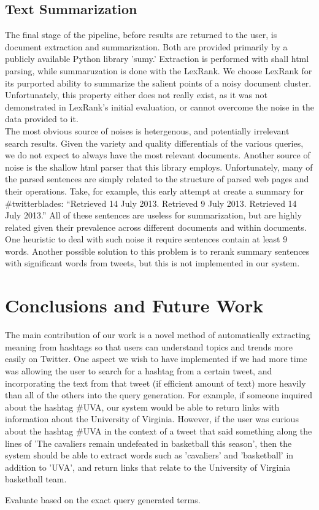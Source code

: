 \documentclass{sig-alternate}
\begin{document}
\subsection{Text Summarization}
The final stage of the pipeline, before results are returned to the user, is document extraction and summarization.  Both are provided primarily by a publicly available Python library 'sumy.'  Extraction is performed with shall html parsing, while summaruzation is done with the LexRank.\cite{lexrank}  We choose LexRank for its purported ability to summarize the salient points of a noisy document cluster.  Unfortunately, this property either does not really exist, as it was not demonstrated in LexRank's initial evaluation, or cannot overcome the noise in the data provided to it.\\
The most obvious source of noises is hetergenous, and potentially irrelevant search results.  Given the variety and quality differentials of the various queries, we do not expect to always have the most relevant documents. Another source of noise is the shallow html parser that this library employs.  Unfortunately, many of the parsed sentences are simply related to the structure of parsed web pages and their operations.  Take, for example, this early attempt at create a summary for \#twitterblades: ``Retrieved 14 July 2013. Retrieved 9 July 2013. Retrieved 14 July 2013.''  All of these sentences are useless for summarization, but are highly related given their prevalence across different documents and within documents.  One heuristic to deal with such noise it require sentences contain at least 9 words.  Another possible solution to this problem is to rerank summary sentences with significant words from tweets, but this is not implemented in our system.




\section{Conclusions and Future Work}
The main contribution of our work is a novel method of automatically extracting meaning from hashtags so that users can understand topics and trends more easily on Twitter. 
One aspect we wish to have implemented if we had more time was allowing the user to search for a hashtag from a certain tweet, and incorporating the text from that tweet (if efficient amount of text) more heavily than all of the others into the query generation. For example, if someone inquired about the hashtag \#UVA, our system would be able to return links with information about the University of Virginia. However, if the user was curious about the hashtag \#UVA in the context of a tweet that said something along the lines of 'The cavaliers remain undefeated in basketball this season', then the system should be able to extract words such as 'cavaliers' and 'basketball' in addition to 'UVA', and return links that relate to the University of Virginia basketball team. 

Evaluate based on the exact query generated terms.



\end{document}
